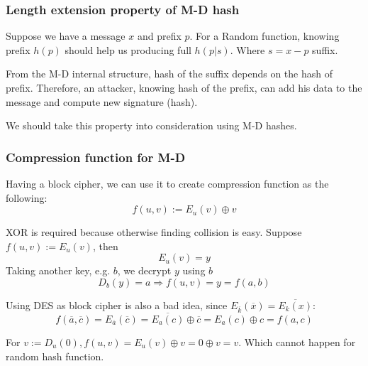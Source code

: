 \subsubsection{Length extension property of M-D hash} Suppose we have a message $x$ and prefix $p$.
For a Random function, knowing prefix $h(p)$ should help us producing full $h(p | s)$. Where $s = x - p$ suffix.

From the M-D internal structure, hash of the suffix depends on the hash of prefix.
Therefore, an attacker, knowing hash of the prefix, can add his data to the message and compute new signature (hash).

We should take this property into consideration using M-D hashes.

\subsubsection{Compression function for M-D}

Having a block cipher, we can use it to create compression function as the following:
\[ f(u,v) := E_u(v) \oplus v \]

XOR is required because otherwise finding collision is easy. Suppose $f(u,v) := E_u(v)$, then
\[ E_u(v) = y \]
Taking another key, e.g. $b$, we decrypt $y$ using $b$
\[ D_b(y) = a \Rightarrow f(u,v) = y = f(a,b) \]

Using DES as block cipher is also a bad idea, since $E_{\overline{k}}(\overline{x}) = \overline{E_k(x)}$:
\[ f(\overline{a}, \overline{c}) = E_{\overline{a}}(\overline{c}) = \overline{E_a(c)} \oplus \overline{c} = E_a(c) \oplus c = f(a,c) \]

For $v := D_u(0), f(u,v) = E_u(v) \oplus v = 0 \oplus v = v$. Which cannot happen for random hash function.

